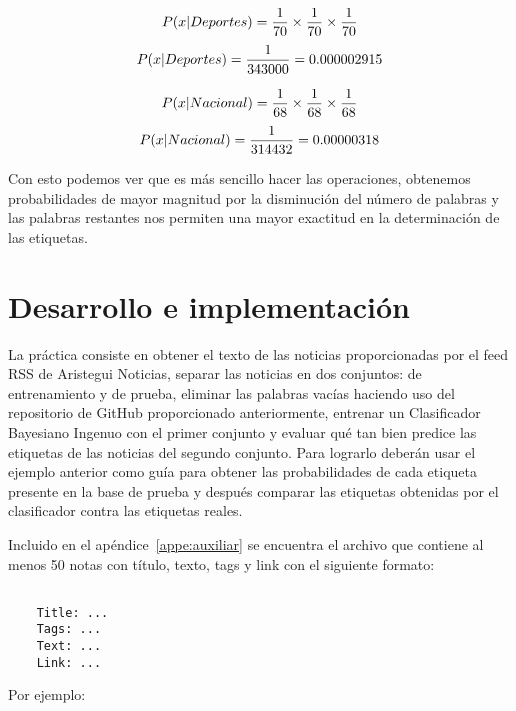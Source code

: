 \[ P(x | Deportes) = {1 \over 70} \times {1 \over 70} \times {1 \over 70} \]
\[ P(x | Deportes) = { 1 \over 343000 } = 0.000002915 \]

\[ P(x | Nacional) = {1 \over 68} \times {1 \over 68} \times {1 \over 68} \]
\[ P(x | Nacional) = { 1 \over 314432 } = 0.00000318 \]

Con esto podemos ver que es más sencillo hacer las operaciones, obtenemos probabilidades de mayor magnitud por la disminución del número de palabras y las palabras restantes nos permiten una mayor exactitud en la determinación de las etiquetas.

\section{Desarrollo e implementaci\'on}

La práctica consiste en obtener el texto de las noticias proporcionadas por el feed RSS de Aristegui Noticias, separar las noticias en dos conjuntos: de entrenamiento y de prueba, eliminar las palabras vacías haciendo uso del repositorio de GitHub proporcionado anteriormente, entrenar un Clasificador Bayesiano Ingenuo con el primer conjunto y evaluar qué tan bien predice las etiquetas de las noticias del segundo conjunto. Para lograrlo deberán usar el ejemplo anterior como guía para obtener las probabilidades de cada etiqueta presente en la base de prueba y después comparar las etiquetas obtenidas por el clasificador contra las etiquetas reales.

Incluido en el apéndice~\ref{appe:auxiliar} se encuentra el archivo  que contiene al menos 50 notas con título, texto, tags y link con el siguiente formato:

\begin{verbatim}

    Title: ...
    Tags: ...
    Text: ...
    Link: ...

\end{verbatim}

Por ejemplo:

